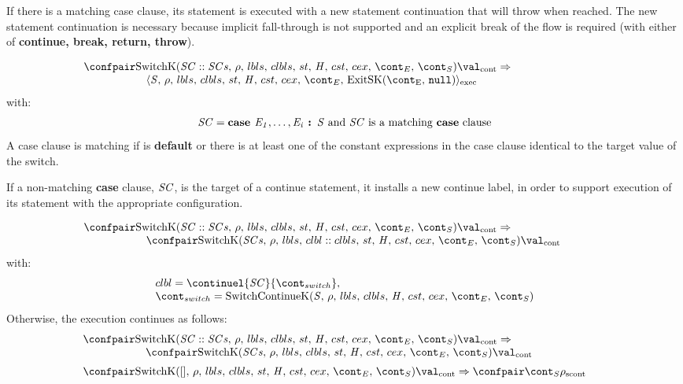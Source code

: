 \documentclass{article}
\begin{document}
If there is a matching case clause, its statement is executed with a new statement continuation that will throw when reached. The new statement continuation is necessary because implicit fall-through is not supported and an explicit break of the flow is required (with either of \textbf{continue, break, return, throw}).

\[
  \begin{array}{lcl}
	\contconf{\SwitchK{\scase :: \scases}{\clbls}}{\val}
	\Rightarrow \hspace{30mm}\\
	\hspace{20mm}\execconf{\stmt}{\env}{\lbls}{\clbls}{\handler}{\cstrace}{\cex}{\econt}{\ExitSK{\tt{null}}}
  \end{array}
\]
with:
\[
	\mathit{SC} = \textbf{case } \mathit{E}_\mathit{1}, \dots, \mathit{E}_\mathit{i} \textbf{ : } \mathit{S} \textrm{ and } \mathit{SC} \textrm{ is a matching \textbf{case} clause}
\]
A case clause is matching if is \textbf{default} or there is at least one of the constant expressions in the case clause identical to the target value of the switch.

\noindent
If a non-matching \textbf{case} clause, $\mathit{SC}$, is the target of a continue statement, it installs a new continue label, in order to support execution of its statement with the appropriate configuration.

\[
  \begin{array}{lcl}
	\contconf{\SwitchK{\scase :: \scases}{\clbls}}{\val}
	\Rightarrow \hspace{30mm}\\
	\hspace{20mm}\contconf{\SwitchK{\scases}{\clbl :: \clbls}}{\val}
  \end{array}
\]
with:
\[
  \begin{array}{l}
	\clbl = \continuel{\scase}{\switchcont},\\
	\switchcont = \continuek
  \end{array}
\]
\noindent
Otherwise, the execution continues as follows:
\[
  \begin{array}{lcl}
    \contconf{\SwitchK{\scase :: \scases}{\clbls}}{\val}
	\Rightarrow \hspace{30mm}\\
	\hspace{20mm}\contconf{\SwitchK{\scases}{\clbls}}{\val}\\[2mm]

	\contconf{\SwitchK{[]}{\clbls}}{\val}
	\Rightarrow
	\scontconf{\scont}{\env}
  \end{array}
\]
\end{document}

